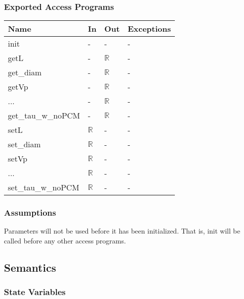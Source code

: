 \documentclass[12pt]{article}
\begin{document}
\subsubsection{Exported Access Programs}

\begin{tabular}{l l l l}
\toprule
\textbf{Name} & \textbf{In} & \textbf{Out} & \textbf{Exceptions} \\
\midrule
init & - & - &  - \\
getL & - & $\mathbb{R}$ &  - \\
get\_diam & - & $\mathbb{R}$ &  - \\
getVp & - & $\mathbb{R}$ &  - \\
... & - & $\mathbb{R}$ &  - \\
get\_tau\_w\_noPCM & - & $\mathbb{R}$ &  - \\
setL & $\mathbb{R}$ & - &  - \\
set\_diam & $\mathbb{R}$ & - &  - \\
setVp & $\mathbb{R}$ & - &  - \\
... & $\mathbb{R}$ & - &  - \\
set\_tau\_w\_noPCM & $\mathbb{R}$ & - &  - \\
\bottomrule
\end{tabular}

\subsubsection{Assumptions}

Parameters will not be used before it has been initialized.  That is, init will
be called before any other access programs.

\subsection{Semantics}

\subsubsection{State Variables}
\end{document}
